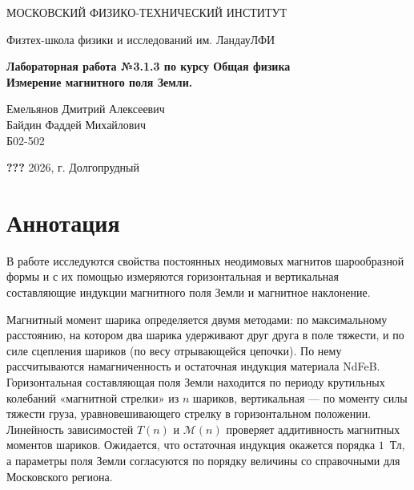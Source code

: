 \documentclass[a4paper,12pt]{article}
\newcommand{\qq}{\textbf{???}}
\begin{document}
\begin{titlepage}
\begin{center}
    {\large МОСКОВСКИЙ ФИЗИКО-ТЕХНИЧЕСКИЙ ИНСТИТУТ}
\end{center}
\begin{center}
    {\large Физтех-школа физики и исследований им. Ландау\break ЛФИ}
\end{center}

    \vspace{3cm}

\vspace{0.15cm}
{
\begin{center}
    \huge \bf Лабораторная работа №3.1.3 по курсу Общая физика\\
    \vspace{0.4cm}
    \LARGE Измерение магнитного поля Земли.
\end{center}
}
\vspace{1.5cm}
\begin{flushright}
Емельянов Дмитрий Алексеевич\\
Байдин Фаддей Михайлович\\
\vspace{0.4cm}
Б02-502
\end{flushright}
\vspace{10cm}
\begin{center}
    \large \qq{} 2026, г. Долгопрудный
\end{center}
\end{titlepage}

\section{Аннотация}
В работе исследуются свойства постоянных неодимовых магнитов шарообразной
формы и с их помощью измеряются горизонтальная и вертикальная составляющие
индукции магнитного поля Земли и магнитное наклонение.

Магнитный момент шарика определяется двумя методами: по максимальному
расстоянию, на котором два шарика удерживают друг друга в поле тяжести, и
по силе сцепления шариков (по весу отрывающейся цепочки). По нему
рассчитываются намагниченность и остаточная индукция материала NdFeB.
Горизонтальная составляющая поля Земли находится по периоду крутильных
колебаний «магнитной стрелки» из $n$ шариков, вертикальная --- по
моменту силы тяжести груза, уравновешивающего стрелку в горизонтальном
положении. Линейность зависимостей $T(n)$ и $\mathcal{M}(n)$ проверяет
аддитивность магнитных моментов шариков. Ожидается, что
остаточная индукция окажется порядка $1$~Тл, а параметры поля Земли
согласуются по порядку величины со справочными для Московского региона.
\end{document}
